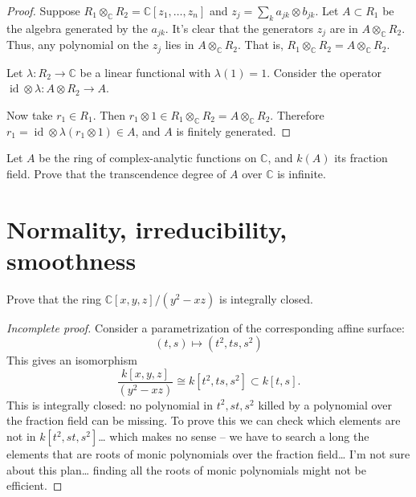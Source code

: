 \begin{proof}
Suppose 
$R_1 \otimes_{\mathbb{C}}R_2
= \mathbb{C}[z_1,…,z_n]$
and
$z_j=\sum_{k}a_{jk} \otimes b_{jk}$.
Let $A\subset R_1$ be the algebra
generated by the $a_{jk}$.
It's clear that the generators
$z_j$ are in $A\otimes_{\mathbb{C}}R_2$.
Thus, any polynomial on the $z_j$
lies in $A \otimes_{\mathbb{C}}R_2$.
That is, $R_1 \otimes_{\mathbb{C}}R_2
=A \otimes_{\mathbb{C}}R_2$.

Let $\lambda:R_2 \to \mathbb{C}$
be a linear functional with $\lambda(1)=1$.
Consider the operator
$\operatorname{id} \otimes \lambda:
A \otimes R_2 \to A$.

Now take $r_1 \in R_1$.
Then $r_1 \otimes 1 \in 
R_1 \otimes_{\mathbb{C}}R_2
=A \otimes_{\mathbb{C}}R_2$.
Therefore
$r_1=\operatorname{id}\otimes \lambda
(r_1 \otimes 1) \in A$,
and $A$ is finitely generated.
\end{proof}

\begin{exercise}
\label{exercise-trans-deg-hol-functions}
Let $A$ be the ring of complex-analytic
functions on $\mathbb{C}$,
and $k(A)$ its fraction field.
Prove that the transcendence degree
of $A$ over $\mathbb{C}$ is infinite.
\end{exercise}


\section{Normality, irreducibility,
smoothness}

\begin{exercise}
\label{exercise-normal-surface}
Prove that the ring 
$\mathbb{C}[x,y,z]/(y^2-xz)$
is integrally closed.
\end{exercise}

\begin{proof}[Incomplete proof]
Consider a parametrization of the
corresponding affine surface:
$$
(t,s) \longmapsto (t^2,t s,s^2)
$$
This gives an isomorphism
$$
\frac{k[x,y,z]}{(y^2-xz)}
\cong
k[t^2,t s,s^2] \subset k[t,s].
$$
This is integrally closed:
no polynomial in $t^2,st,s^2$ killed
by a polynomial over the fraction
field can be missing.
To prove this we can check which elements
are not in $k[t^2,s t,s^2]$…
which makes no sense -- we have
to search a long the elements
that are roots of monic polynomials
over the fraction field… I'm not sure
about this plan… finding all the
roots of monic polynomials might not
be efficient.
\end{proof}

